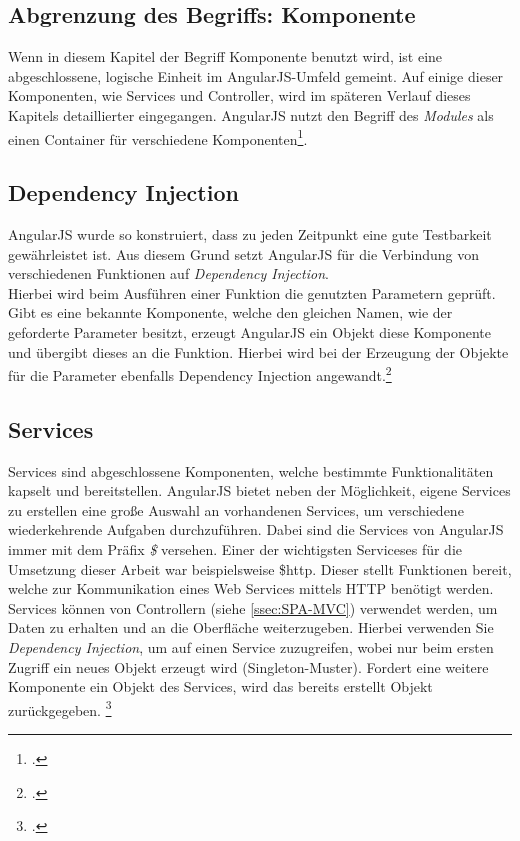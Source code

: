 \subsection{Abgrenzung des Begriffs: Komponente}
Wenn in diesem Kapitel der Begriff Komponente benutzt wird, ist eine abgeschlossene, logische Einheit im AngularJS-Umfeld gemeint. Auf einige dieser Komponenten, wie Services und Controller, wird im späteren Verlauf dieses Kapitels detaillierter eingegangen. AngularJS nutzt den Begriff des \textit{Modules} als einen Container für verschiedene Komponenten\footcite{online:angular:module}. 
\subsection{Dependency Injection}
\label{ssec:SPA-Dependency-Injection}
AngularJS wurde so konstruiert, dass zu jeden Zeitpunkt eine gute Testbarkeit gewährleistet ist. Aus diesem Grund setzt AngularJS für die Verbindung von verschiedenen Funktionen auf \textit{Dependency Injection}. \\ Hierbei wird beim Ausführen einer Funktion die genutzten Parametern geprüft. Gibt es eine bekannte Komponente, welche den gleichen Namen, wie der geforderte Parameter besitzt, erzeugt AngularJS ein Objekt diese Komponente und übergibt dieses an die Funktion. Hierbei wird bei der Erzeugung der Objekte für die Parameter ebenfalls Dependency Injection angewandt.\footcite{online:angularjs:dependency-injection}
\subsection{Services}
\label{ssec:SPA-Services}
Services sind abgeschlossene Komponenten, welche bestimmte Funktionalitäten kapselt und bereitstellen. AngularJS bietet neben der Möglichkeit, eigene Services zu erstellen eine große Auswahl an vorhandenen Services, um verschiedene wiederkehrende Aufgaben durchzuführen. Dabei sind die Services von AngularJS immer mit dem Präfix \textit{\$} versehen. Einer der wichtigsten Serviceses für die Umsetzung dieser Arbeit war beispielsweise \$http. Dieser stellt Funktionen bereit, welche zur Kommunikation eines Web Services mittels HTTP benötigt werden. \\
Services können von Controllern (siehe \ref{ssec:SPA-MVC}) verwendet werden, um Daten zu erhalten und an die Oberfläche weiterzugeben. Hierbei verwenden Sie \textit{Dependency Injection}, um auf einen Service zuzugreifen, wobei nur beim ersten Zugriff ein neues Objekt erzeugt wird (\ac{Singleton}-Muster). Fordert eine weitere Komponente ein Objekt des Services, wird das bereits erstellt Objekt zurückgegeben. \footcite{online:angular:services}
